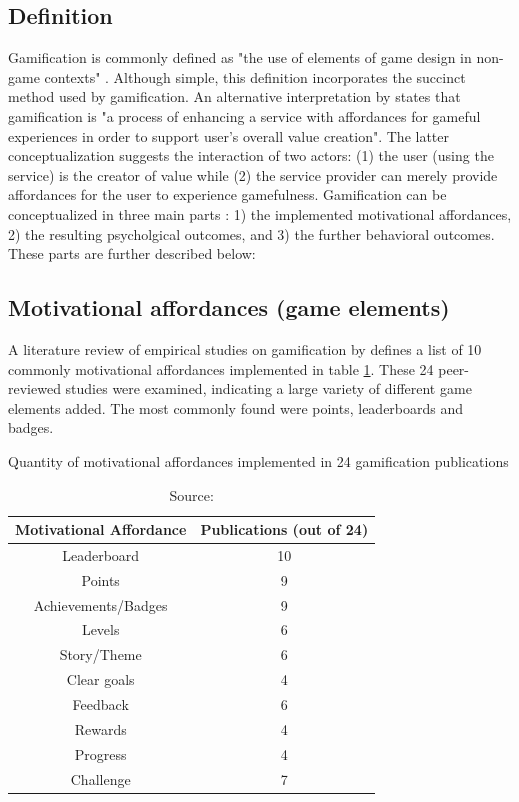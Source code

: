 \subsection{Definition}

Gamification is commonly defined as "the use of elements of game design in non-game contexts" \cite{deterding2011game}. Although simple, this definition incorporates the succinct method used by gamification. An alternative interpretation by \cite{huotari2012defining} states that gamification is "a process of enhancing a service with affordances for gameful experiences in order to support user's overall value creation". The latter conceptualization suggests the interaction of two actors: (1) the user (using the service) is the creator of value while (2) the service provider can merely provide affordances for the user to experience gamefulness. Gamification can be conceptualized in three main parts \cite{hamari2014does}: 1) the implemented motivational affordances, 2) the resulting psycholgical outcomes, and 3) the further behavioral outcomes. These parts are further described below: 

\subsection{Motivational affordances (game elements)}

A literature review of empirical studies on gamification by \cite{hamari2014does} defines a list of 10 commonly motivational affordances implemented in table \ref{tab:motivational-affordances}. These 24 peer-reviewed studies were examined, indicating a large variety of different game elements added. The most commonly found were points, leaderboards and badges.

\begin{table}[h]
    \centering
    \caption{Quantity of motivational affordances implemented in 24 gamification publications}
    \begin{tabular}{|c|c|}
        \hline Motivational Affordance & Publications (out of 24) \\
        \hline Leaderboard & 10\\ 
        \hline Points & 9 \\
        \hline Achievements/Badges & 9 \\
        \hline Levels & 6 \\
        \hline Story/Theme & 6 \\
        \hline Clear goals & 4 \\
        \hline Feedback & 6 \\
        \hline Rewards & 4 \\
        \hline Progress & 4 \\
        \hline Challenge & 7 \\
        \hline
    \end{tabular}
    \caption*{Source: \cite{hamari2014does}}
    \label{tab:motivational-affordances}
\end{table}

